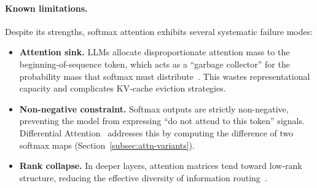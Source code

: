 \paragraph{Known limitations.}
Despite its strengths, softmax attention exhibits several systematic failure modes:
\begin{itemize}
\item \textbf{Attention sink.} LLMs allocate disproportionate attention mass to the beginning-of-sequence token, which acts as a ``garbage collector'' for the probability mass that softmax must distribute~\cite{xiao2023streamingllm}. This wastes representational capacity and complicates KV-cache eviction strategies.
\item \textbf{Non-negative constraint.} Softmax outputs are strictly non-negative, preventing the model from expressing ``do not attend to this token'' signals. Differential Attention~\cite{ye2024differential} addresses this by computing the difference of two softmax maps (Section~\ref{subsec:attn-variants}).
\item \textbf{Rank collapse.} In deeper layers, attention matrices tend toward low-rank structure, reducing the effective diversity of information routing~\cite{dong2021attention}.
\end{itemize}

